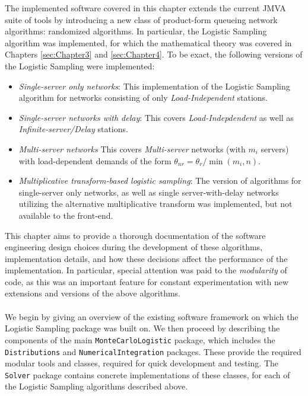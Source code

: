 The implemented software covered in this chapter extends the current JMVA \cite{JavaJMT} suite of tools by introducing a new class of product-form queueing network algorithms: randomized algorithms. In particular, the Logistic Sampling algorithm was implemented, for which the mathematical theory was covered in Chapters \ref{sec:Chapter3} and \ref{sec:Chapter4}. To be exact, the following versions of the Logistic Sampling were implemented:
\begin{itemize}[noitemsep]
    \item \textit{Single-server only networks}: This implementation of the Logistic Sampling algorithm for networks consisting of only \textit{Load-Independent} stations.
    \item \textit{Single-server networks with delay}: This covers \textit{Load-Indepdendent} as well as \textit{Infinite-server/Delay} stations.
    \item \textit{Multi-server networks} This covers \textit{Multi-server} networks (with \(m_i\) servers) with load-dependent demands of the form \(\theta_{nr} = \theta_r/\min(m_i, n)\).
    \item \textit{Multiplicative transform-based logistic sampling}: The version of algorithms for single-server only networks, as well as single server-with-delay networks utilizing the alternative multiplicative transform was implemented, but not available to the front-end.
\end{itemize}

This chapter aims to provide a thorough documentation of the software engineering design choices during the development of these algorithms, implementation details, and how these decisions affect the performance of the implementation. In particular, special attention was paid to the \textit{modularity} of code, as this was an important feature for constant experimentation with new extensions and versions of the above algorithms.
\\\\
We begin by giving an overview of the existing software framework on which the Logistic Sampling package was built on. We then proceed by describing the components of the main \texttt{MonteCarloLogistic} package, which includes the \texttt{Distributions} and \texttt{NumericalIntegration} packages. These provide the required modular tools and classes, required for quick development and testing. The \texttt{Solver} package contains concrete implementations of these classes, for each of the Logistic Sampling algorithms described above.

